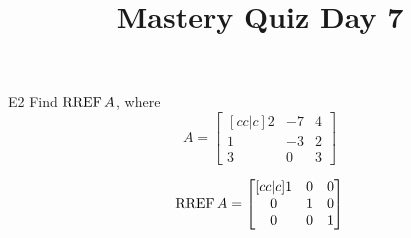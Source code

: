 \documentclass{sbgLAquiz}
\title{Mastery Quiz Day 7 }
\begin{document}
\begin{problem}{E2}
Find \(\operatorname{RREF} A\), where
\[
  A =
  \begin{bmatrix}[cc|c]
    2 & -7 & 4 \\
    1 & -3 & 2 \\
    3 & 0 & 3
  \end{bmatrix}
\]
\end{problem}
\begin{solution}
\[
  \operatorname{RREF} A =
  \begin{bmatrix}[cc|c]
    1 & 0 & 0 \\
    0 & 1 & 0 \\
    0 & 0 & 1
  \end{bmatrix}
\]
\end{solution}
\end{document}
